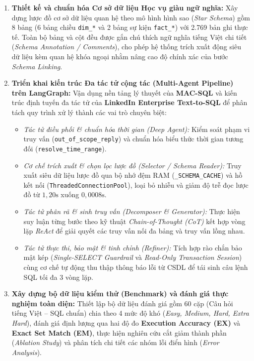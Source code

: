 \documentclass[12pt,a4paper]{report}
\begin{document}
\begin{enumerate}
    \item \textbf{Thiết kế và chuẩn hóa Cơ sở dữ liệu Học vụ giàu ngữ nghĩa:} Xây dựng lược đồ cơ sở dữ liệu quan hệ theo mô hình hình sao (\textit{Star Schema}) gồm 8 bảng (6 bảng chiều \texttt{dim\_*} và 2 bảng sự kiện \texttt{fact\_*}) với 2.769 bản ghi thực tế. Toàn bộ bảng và cột đều được gắn chú thích ngữ nghĩa tiếng Việt chi tiết (\textit{Schema Annotation / Comments}), cho phép hệ thống trích xuất động siêu dữ liệu kèm quan hệ khóa ngoại nhằm nâng cao độ chính xác của bước \textit{Schema Linking}.
    \item \textbf{Triển khai kiến trúc Đa tác tử cộng tác (Multi-Agent Pipeline) trên LangGraph:} Vận dụng nền tảng lý thuyết của \textbf{MAC-SQL} \cite{wang2025macsql} và kiến trúc định tuyến đa tác tử của \textbf{LinkedIn Enterprise Text-to-SQL} \cite{chen2025enterprise} để phân tách quy trình xử lý thành các vai trò chuyên biệt:
    \begin{itemize}
        \item \textit{Tác tử điều phối \& chuẩn hóa thời gian (Deep Agent):} Kiểm soát phạm vi truy vấn (\texttt{out\_of\_scope\_reply}) và chuẩn hóa biểu thức thời gian tương đối (\texttt{resolve\_time\_range}).
        \item \textit{Cơ chế trích xuất \& chọn lọc lược đồ (Selector / Schema Reader):} Truy xuất siêu dữ liệu lược đồ qua bộ nhớ đệm RAM (\texttt{\_SCHEMA\_CACHE}) và hồ kết nối (\texttt{ThreadedConnectionPool}), loại bỏ nhiễu và giảm độ trễ đọc lược đồ từ $1{,}20\text{s}$ xuống $0{,}0008\text{s}$.
        \item \textit{Tác tử phân rã \& sinh truy vấn (Decomposer \& Generator):} Thực hiện suy luận từng bước theo kỹ thuật \textit{Chain-of-Thought (CoT)} kết hợp vòng lặp \textit{ReAct} để giải quyết các truy vấn nối đa bảng và truy vấn lồng nhau.
        \item \textit{Tác tử thực thi, bảo mật \& tinh chỉnh (Refiner):} Tích hợp rào chắn bảo mật kép (\textit{Single-SELECT Guardrail} và \textit{Read-Only Transaction Session}) cùng cơ chế tự động thu thập thông báo lỗi từ CSDL để tái sinh câu lệnh SQL tối đa 3 vòng lặp.
    \end{itemize}
    \item \textbf{Xây dựng bộ dữ liệu kiểm thử (Benchmark) và đánh giá thực nghiệm toàn diện:} Thiết lập bộ dữ liệu đánh giá gồm 60 cặp (Câu hỏi tiếng Việt -- SQL chuẩn) chia theo 4 mức độ khó (\textit{Easy, Medium, Hard, Extra Hard}), đánh giá định lượng qua hai độ đo \textbf{Execution Accuracy (EX)} và \textbf{Exact Set Match (EM)}, thực hiện nghiên cứu cắt giảm thành phần (\textit{Ablation Study}) và phân tích chi tiết các nhóm lỗi điển hình (\textit{Error Analysis}).
\end{enumerate}
\end{document}
